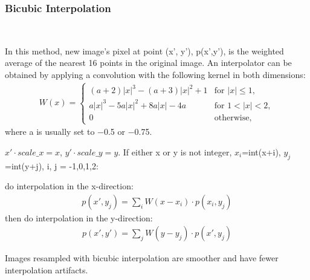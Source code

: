 \documentclass[journal,conference]{IEEEtran}
\begin{document}
\subsubsection{Bicubic Interpolation}
~\\
\par In this method, new image’s pixel at point (x', y'), p(x',y'), is the weighted average of the nearest 16 points in the original image. An interpolator can be obtained by applying a convolution with the following kernel in both dimensions:
\begin{align*}
{\displaystyle W(x)={\begin{cases}(a+2)|x|^{3}-(a+3)|x|^{2}+1&{\text{for }}|x|\leq 1,\\a|x|^{3}-5a|x|^{2}+8a|x|-4a&{\text{for }}1<|x|<2,\\0&{\text{otherwise}},\end{cases}}}
\end{align*}
where a is usually set to −0.5 or −0.75.
\par $x'\cdot scale\_x=x$, $y'\cdot scale\_y=y$. If either x or y is not integer, $x_i$=int(x+i), $y_j$=int(y+j), i, j = -1,0,1,2:

do interpolation in the x-direction:
\begin{align*}
p(x',y_j)=\sum_{i}{W(x-x_i)\cdot p(x_i,y_j)}
\end{align*}
then do interpolation in the y-direction:
\begin{align*}
p(x',y')=\sum_{j}{W(y-y_j)\cdot p(x',y_j)} 
\end{align*}
\par Images resampled with bicubic interpolation are smoother and have fewer interpolation artifacts.
~\\
\end{document}
